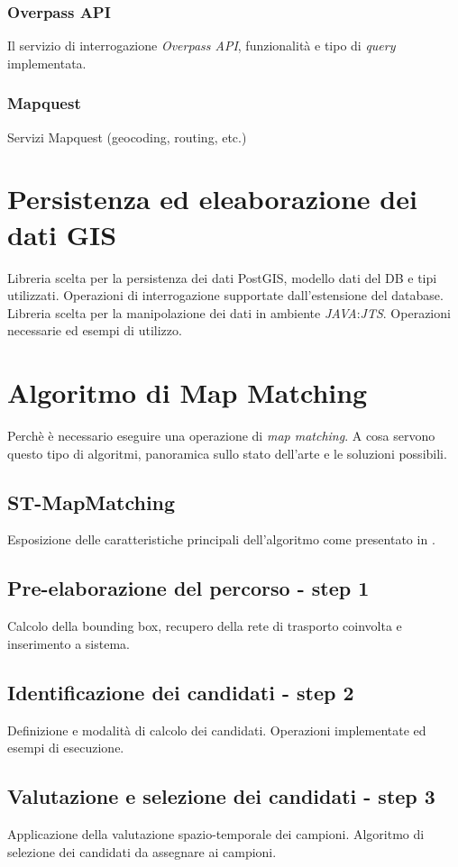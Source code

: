 \subsubsection{Overpass API}
Il servizio di interrogazione \emph{Overpass API}, funzionalità e tipo di \emph{query} implementata.
\subsubsection{Mapquest}
Servizi Mapquest (geocoding, routing, etc.)

\section{Persistenza ed eleaborazione dei dati GIS}
Libreria scelta per la persistenza dei dati PostGIS, modello dati del DB e tipi utilizzati. Operazioni di interrogazione supportate dall'estensione del database.
Libreria scelta per la manipolazione dei dati in ambiente \emph{JAVA}:\emph{JTS}. Operazioni necessarie ed esempi di utilizzo. 

\section{Algoritmo di Map Matching}
Perchè è necessario eseguire una operazione di \emph{map matching}. A cosa servono questo tipo di algoritmi, panoramica sullo stato dell'arte e le soluzioni possibili.
\subsection{ST-MapMatching}
Esposizione delle caratteristiche principali dell'algoritmo come presentato in \cite{stmapmatching}.
\subsection{Pre-elaborazione del percorso - step 1}
Calcolo della bounding box, recupero della rete di trasporto coinvolta e inserimento a sistema.
\subsection{Identificazione dei candidati - step 2}
Definizione e modalità di calcolo dei candidati. Operazioni implementate ed esempi di esecuzione.
\subsection{Valutazione e selezione dei candidati - step 3}
Applicazione della valutazione spazio-temporale dei campioni. Algoritmo di selezione dei candidati da assegnare ai campioni. 